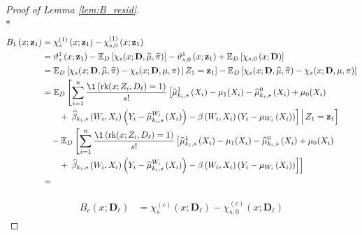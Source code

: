 \begin{proof}[Proof of Lemma \ref{lem:B_resid}]\mbox{}\\*
    \begin{equation}
        \begin{aligned}
            B_{1}\left(x; \mathbf{z}_1\right)
            & = \chi_{s}^{(1)}\left(x; \mathbf{z}_1\right) - \chi_{s,0}^{(1)}\left(x; \mathbf{z}_1\right)\\
            & = \vartheta_{s}^{1}\left(x; \mathbf{z}_{1}\right)
            - \E_{D}\left[\chi_{s}(x; \mathbf{D}, \hat{\mu}, \hat{\pi})\right]
            - \vartheta_{s,0}^{1}\left(x; \mathbf{z}_{1}\right) 
            + \E_{D}\left[\chi_{s,0}\left(x; \mathbf{D}\right)\right] \\
            & = \E_{D}\left[\chi_{s}(x; \mathbf{D}, \hat{\mu}, \hat{\pi}) - \chi_{s}(x; \mathbf{D}, \mu, \pi)\, \middle| \, Z_1 = \mathbf{z}_1\right]
            - \E_{D}\left[\chi_{s}(x; \mathbf{D}, \hat{\mu}, \hat{\pi}) - \chi_{s}(x; \mathbf{D}, \mu, \pi)\right] \\
            & = \E_{D}\left[\sum_{i = 1}^{n}\frac{\1\left(\rk(x; Z_{i}, D_{\ell}) = 1\right)}{s!}   
            \left[\hat{\mu}_{k_i,s}^{1}\left(X_{i}\right) - \mu_{1}(X_{i})
            - \hat{\mu}_{k_i,s}^{0}\left(X_{i}\right) + \mu_{0}(X_{i}) \right. \right.\\
            & \quad \quad + \left. \left. 
            \hat{\beta}_{k_i,s}\left(W_{i}, X_{i}\right)\left(Y_{i} - \hat{\mu}^{W_{i}}_{k_i,s}\left(X_{i}\right)\right)
            - \beta\left(W_{i}, X_{i}\right)\left(Y_{i} - \mu_{W_{i}}\left(X_{i}\right)\right)\right]
            \, \middle| \, Z_1 = \mathbf{z}_1\right] \\
            & \quad - \E_{D}\left[\sum_{i = 1}^{n}\frac{\1\left(\rk(x; Z_{i}, D_{\ell}) = 1\right)}{s!}   
            \left[\hat{\mu}_{k_i,s}^{1}\left(X_{i}\right) - \mu_{1}(X_{i})
            - \hat{\mu}_{k_i,s}^{0}\left(X_{i}\right) + \mu_{0}(X_{i}) \right. \right.\\
            & \quad \quad + \left. \left. 
            \hat{\beta}_{k_i,s}\left(W_{i}, X_{i}\right)\left(Y_{i} - \hat{\mu}^{W_{i}}_{k_i,s}\left(X_{i}\right)\right)
            - \beta\left(W_{i}, X_{i}\right)\left(Y_{i} - \mu_{W_{i}}\left(X_{i}\right)\right)\right]\right] \\
            & = 
        \end{aligned}
    \end{equation}

    \begin{equation}
        \begin{aligned}
            B_{c}\left(x; \mathbf{D}_{\ell}\right)
            & = \chi_{s}^{(c)}\left(x; \mathbf{D}_{\ell}\right) - \chi_{s,0}^{(c)}\left(x; \mathbf{D}_{\ell}\right)
        \end{aligned}
    \end{equation}
\end{proof}

